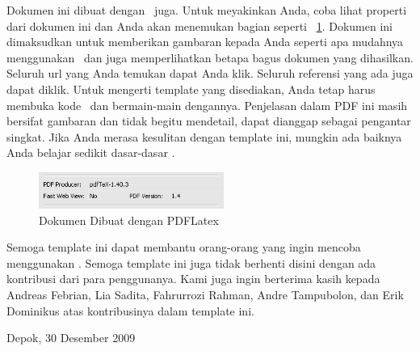 Dokumen ini dibuat dengan \latex~juga. Untuk meyakinkan Anda, coba lihat properti dari dokumen ini dan Anda akan menemukan bagian seperti \pic~\ref{fig:pdflatex}. Dokumen ini dimaksudkan untuk memberikan gambaran kepada Anda seperti apa mudahnya menggunakan \latex~dan juga memperlihatkan betapa bagus dokumen yang dihasilkan. Seluruh url yang Anda temukan dapat Anda klik. Seluruh referensi yang ada juga dapat diklik. Untuk mengerti template yang disediakan, Anda tetap harus membuka kode \latex~dan bermain-main dengannya. Penjelasan dalam PDF ini masih bersifat gambaran dan tidak begitu mendetail, dapat dianggap sebagai pengantar singkat. Jika Anda merasa kesulitan dengan template ini, mungkin ada baiknya Anda belajar sedikit dasar-dasar \latex. 

\begin{figure}
	\centering
	\includegraphics[width=0.54\textwidth]
		{pics/mark.png}
	\caption{Dokumen Dibuat dengan PDFLatex}
	\label{fig:pdflatex}
\end{figure}

Semoga template ini dapat membantu orang-orang yang ingin mencoba menggunakan \latex. Semoga template ini juga tidak berhenti disini dengan ada kontribusi dari para penggunanya. Kami juga ingin berterima kasih kepada Andreas Febrian, Lia Sadita, Fahrurrozi 
Rahman, Andre Tampubolon, dan Erik Dominikus atas kontribusinya dalam template ini. 

\vspace*{0.1cm}
\begin{flushright}
Depok, 30 Desember 2009\\[0.1cm]
\vspace*{1cm}
\penulis

\end{flushright}